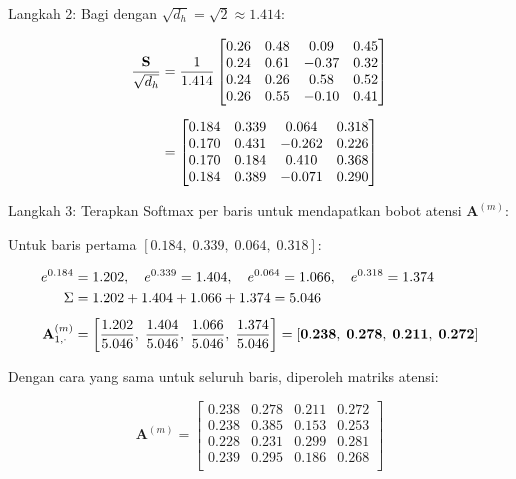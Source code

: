 \noindent Langkah 2: Bagi dengan $\sqrt{d_h} = \sqrt{2} \approx 1.414$:
 
\vspace{0.5cm}
\begin{align*}
  \frac{\mathbf{S}}{\sqrt{d_h}}
  &= \frac{1}{1.414}
     \begin{bmatrix}
       0.26 & 0.48 & 0.09 & 0.45 \\
       0.24 & 0.61 & -0.37 & 0.32 \\
       0.24 & 0.26 & 0.58 & 0.52 \\
       0.26 & 0.55 & -0.10 & 0.41
     \end{bmatrix} \notag \\[6pt]
  &= \begin{bmatrix}
      0.184 & 0.339 & 0.064 & 0.318 \\
      0.170 & 0.431 & -0.262 & 0.226 \\
      0.170 & 0.184 & 0.410 & 0.368 \\
      0.184 & 0.389 & -0.071 & 0.290
    \end{bmatrix}
\end{align*}
\vspace{0.5cm}
 
\noindent Langkah 3: Terapkan Softmax per baris untuk mendapatkan
bobot atensi $\mathbf{A}^{(m)}$:
 
\vspace{0.5cm}
\noindent
Untuk baris pertama $[0.184,\; 0.339,\; 0.064,\; 0.318]$:
 
\vspace{0.5cm}
\begin{align}
  e^{0.184} &= 1.202, \quad
  e^{0.339}  = 1.404, \quad
  e^{0.064}  = 1.066, \quad
  e^{0.318}  = 1.374 \notag \\
  \Sigma &= 1.202 + 1.404 + 1.066 + 1.374 = 5.046 \notag \\[4pt]
  \mathbf{A}^{(m)}_{1,\cdot}
  &= \left[\frac{1.202}{5.046},\;\frac{1.404}{5.046},\;
           \frac{1.066}{5.046},\;\frac{1.374}{5.046}\right]
   = [\mathbf{0.238},\; \mathbf{0.278},\; \mathbf{0.211},\; \mathbf{0.272}]
\end{align}
\vspace{0.5cm}
 
\noindent
Dengan cara yang sama untuk seluruh baris, diperoleh matriks atensi:
 
\vspace{0.5cm}
\begin{equation*}
  \mathbf{A}^{(m)} =
  \begin{bmatrix}
    0.238 & 0.278 & 0.211 & 0.272 \\
    0.238 & 0.385 & 0.153 & 0.253 \\
    0.228 & 0.231 & 0.299 & 0.281 \\
    0.239 & 0.295 & 0.186 & 0.268 \\
  \end{bmatrix}
\end{equation*}
\vspace{0.5cm}
 
